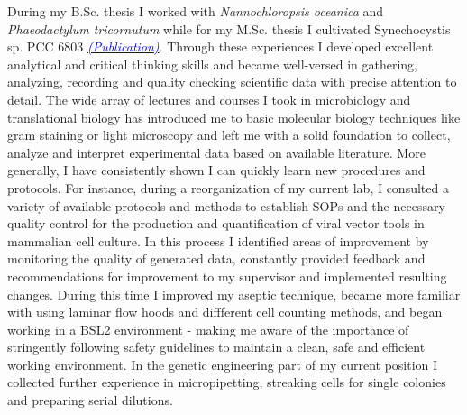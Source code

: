 \documentclass[11pt,a4paper,sans]{moderncv}
\begin{document}
\begin{spacing}{1.15}
During my B.Sc. thesis I worked with \textit{Nannochloropsis oceanica} and \textit{Phaeodactylum tricornutum} while for my M.Sc. thesis I cultivated Synechocystis sp. PCC 6803 {\href{https://www.ncbi.nlm.nih.gov/pubmed/29517395}{\textcolor{blue}{{\textit{(Publication)}}}}}. Through these experiences I developed excellent analytical and critical thinking skills and became well-versed in gathering, analyzing, recording and quality checking scientific data with precise attention to detail. The wide array of lectures and courses I took in microbiology and translational biology has introduced me to basic molecular biology techniques like gram staining or light microscopy and left me with a solid foundation to collect, analyze and interpret experimental data based on available literature. More generally, I have consistently shown I can quickly learn new procedures and protocols. For instance, during a reorganization of my current lab, I consulted a variety of available protocols and methods to establish SOPs and the necessary quality control for the production and quantification of viral vector tools in mammalian cell culture. In this process I identified areas of improvement by monitoring the quality of generated data, constantly provided feedback and recommendations for improvement to my supervisor and implemented resulting changes. During this time I improved my aseptic technique, became more familiar with using laminar flow hoods and diffferent cell counting methods, and began working in a BSL2 environment - making me aware of the importance of stringently following safety guidelines to maintain a clean, safe and efficient working environment. In the genetic engineering part of my current position I collected further experience in micropipetting, streaking cells for single colonies and preparing serial dilutions. \par\vspace*{2mm}
 

\end{spacing}
\end{document}
